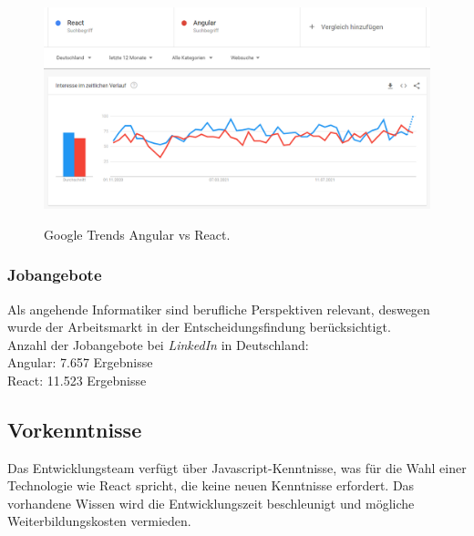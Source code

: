\begin{figure}[h!]
  \centering
  \includegraphics[scale=0.5]{sources/GoogleTrends React Angular 1.11.2020 29.10.2021}
  \caption[Google Trends Angular vs React]{}
  \label{fig:GoogleTrends React Angular 1.11.2020 29.10.2021} 
  Google Trends Angular vs React{\cite{GO01}}.
\end{figure}

\subsubsection*{Jobangebote}
Als angehende Informatiker sind berufliche Perspektiven relevant, deswegen wurde der Arbeitsmarkt in der Entscheidungsfindung berücksichtigt.
\\
Anzahl der Jobangebote bei \textit{LinkedIn} in Deutschland:\\
Angular: 7.657 Ergebnisse{\cite{LI1}}\\
React: 11.523 Ergebnisse{\cite{LI2}}

\subsection{Vorkenntnisse}
Das Entwicklungsteam verfügt über Javascript-Kenntnisse, was für die Wahl einer Technologie wie React spricht, die keine neuen Kenntnisse erfordert. Das vorhandene Wissen wird die Entwicklungszeit beschleunigt und mögliche Weiterbildungskosten vermieden.


